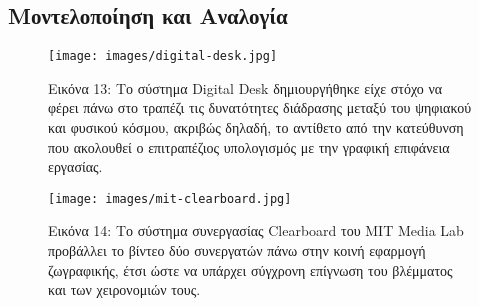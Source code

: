 \documentclass[
]{article}
\begin{document}
\hypertarget{ux3bcux3bfux3bdux3c4ux3b5ux3bbux3bfux3c0ux3bfux3afux3b7ux3c3ux3b7-ux3baux3b1ux3b9-ux3b1ux3bdux3b1ux3bbux3bfux3b3ux3afux3b1}{%
\subsection{Μοντελοποίηση και
Αναλογία}\label{ux3bcux3bfux3bdux3c4ux3b5ux3bbux3bfux3c0ux3bfux3afux3b7ux3c3ux3b7-ux3baux3b1ux3b9-ux3b1ux3bdux3b1ux3bbux3bfux3b3ux3afux3b1}}

\leavevmode{}%
\begin{figure}
\hypertarget{fig:digital-desk}{%
\centering
\texttt{[image: images/digital-desk.jpg]}
\caption{Εικόνα 13: Το σύστημα Digital Desk δημιουργήθηκε είχε στόχο να
φέρει πάνω στο τραπέζι τις δυνατότητες διάδρασης μεταξύ του ψηφιακού και
φυσικού κόσμου, ακριβώς δηλαδή, το αντίθετο από την κατεύθυνση που
ακολουθεί ο επιτραπέζιος υπολογισμός με την γραφική επιφάνεια
εργασίας.}\label{fig:digital-desk}
}
\end{figure}

\leavevmode{}%
\begin{figure}
\hypertarget{fig:mit-clearboard}{%
\centering
\texttt{[image: images/mit-clearboard.jpg]}
\caption{Εικόνα 14: Το σύστημα συνεργασίας Clearboard του MIT Media Lab
προβάλλει το βίντεο δύο συνεργατών πάνω στην κοινή εφαρμογή ζωγραφικής,
έτσι ώστε να υπάρχει σύγχρονη επίγνωση του βλέμματος και των χειρονομιών
τους.}\label{fig:mit-clearboard}
}
\end{figure}
\end{document}
